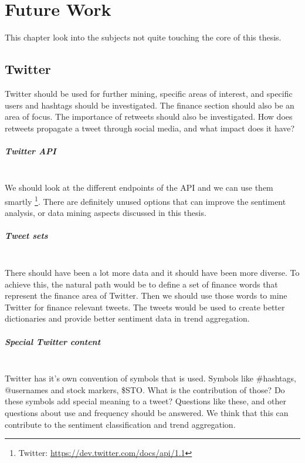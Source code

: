 \chapter{Future Work}\label{future_work}
This chapter look into the subjects not
quite touching the core of this thesis.
%

\section{Twitter}\label{future_work:twitter}
Twitter should be used for further mining, specific areas of interest, and
specific users and hashtags should be investigated. 
The finance section should also be an area of focus. 
The importance of retweets should also be investigated. How does retweets
propagate a tweet through social media, and what impact does it have?

\paragraph{Twitter API}
\hspace{0pt}\\
We should look at the different endpoints of the API and we can
use them smartly \footnote{Twitter: \url{https://dev.twitter.com/docs/api/1.1}}.
There are definitely unused options that can improve the sentiment analysis, or
data mining aspects discussed in this thesis. 

\paragraph{Tweet sets}
\hspace{0pt}\\
There should have been a lot more data and it should have been more diverse. To
achieve this, the natural path would be to define a set of finance words that
represent the finance area of Twitter. Then we should use those words to mine
Twitter for finance relevant tweets. The tweets would be used to create better
dictionaries and provide better sentiment data in trend aggregation.  

\paragraph{Special Twitter content}
\hspace{0pt}\\
Twitter has it's own convention of symbols that is used. Symbols like \#hashtags,
@usernames and stock markers, \$STO. What is the contribution of those? Do these
symbols add special meaning to a tweet? Questions like these, and other
questions about use and frequency should be answered. We think that this can
contribute to the sentiment classification and trend aggregation. 

